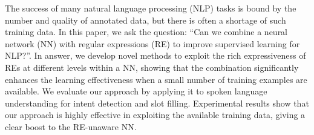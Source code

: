 The success of many natural language processing (NLP) tasks is bound by the number and quality of annotated data, but there is often a shortage of such training data. In this paper, we ask the question: ``Can we combine a neural network (NN) with regular expressions (RE) to improve supervised learning for NLP?''. In answer, we develop novel methods to exploit the rich expressiveness of REs at different levels within a NN, showing that the combination significantly enhances the learning effectiveness when a small number of training examples are available. We evaluate our approach by applying it to spoken language understanding for intent detection and slot filling. Experimental results show that our approach is highly effective in exploiting the available training data, giving a clear boost to the RE-unaware NN.

